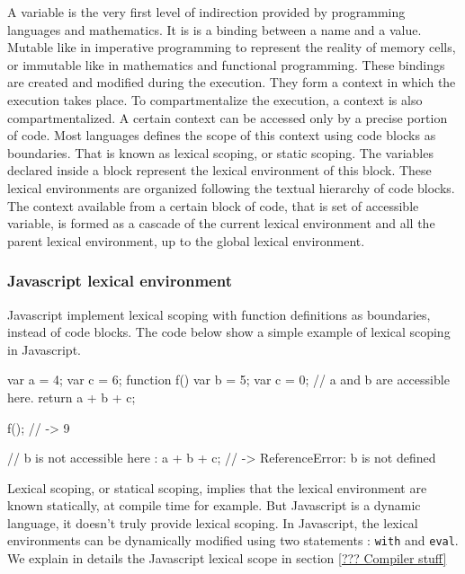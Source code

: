 A variable is the very first level of indirection provided by programming languages and mathematics.
It is is a binding between a name and a value.
Mutable like in imperative programming to represent the reality of memory cells, or immutable like in mathematics and functional programming.
These bindings are created and modified during the execution.
They form a context in which the execution takes place.
To compartmentalize the execution, a context is also compartmentalized.
A certain context can be accessed only by a precise portion of code.
Most languages defines the scope of this context using code blocks as boundaries.
That is known as lexical scoping, or static scoping.
The variables declared inside a block represent the lexical environment of this block.
These lexical environments are organized following the textual hierarchy of code blocks.
The context available from a certain block of code, that is set of accessible variable, is formed as a cascade of the current lexical environment and all the parent lexical environment, up to the global lexical environment.


\subsubsection{Javascript lexical environment}

Javascript implement lexical scoping with function definitions as boundaries, instead of code blocks.
The code below show a simple example of lexical scoping in Javascript.

\begin{code}
  var a = 4;
  var c = 6;
  function f() {
    var b = 5;
    var c = 0;
    // a and b are accessible here.
    return a + b + c;
  }

  f(); // -> 9

  // b is not accessible here :
  a + b + c; // -> ReferenceError: b is not defined
\end{code}

Lexical scoping, or statical scoping, implies that the lexical environment are known statically, at compile time for example.
But Javascript is a dynamic language, it doesn't truly provide lexical scoping.
In Javascript, the lexical environments can be dynamically modified using two statements : \texttt{with} and \texttt{eval}.
We explain in details the Javascript lexical scope in section \ref{??? Compiler stuff}

